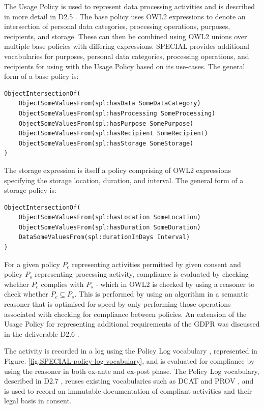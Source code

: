 The Usage Policy \cite{bonatti_special_2018-2} is used to represent data processing activities and is described in more detail in D2.5 \cite{bonatti_d2.5_2018}. The base policy uses OWL2 expressions to denote an intersection of personal data categories, processing operations, purposes, recipients, and storage. These can then be combined using OWL2 unions over multiple base policies with differing expressions. SPECIAL provides additional vocabularies for purposes, personal data categories, processing operations, and recipients for using with the Usage Policy based on its use-cases. The general form of a base policy is:
\begin{lstlisting}
ObjectIntersectionOf(
    ObjectSomeValuesFrom(spl:hasData SomeDataCategory)
    ObjectSomeValuesFrom(spl:hasProcessing SomeProcessing)
    ObjectSomeValuesFrom(spl:hasPurpose SomePurpose)
    ObjectSomeValuesFrom(spl:hasRecipient SomeRecipient)
    ObjectSomeValuesFrom(spl:hasStorage SomeStorage)
)
\end{lstlisting}
The storage expression is itself a policy comprising of OWL2 expressions specifying the storage location, duration, and interval. The general form of a storage policy is:
\begin{lstlisting}
ObjectIntersectionOf(
    ObjectSomeValuesFrom(spl:hasLocation SomeLocation)
    ObjectSomeValuesFrom(spl:hasDuration SomeDuration)
    DataSomeValuesFrom(spl:durationInDays Interval)
)
\end{lstlisting}

For a given policy $P_c$ representing activities permitted by given consent and policy $P_s$ representing processing activity, compliance is evaluated by checking whether $P_c$ complies with $P_s$ - which in OWL2 is checked by using a reasoner to check whether $P_c \subseteq P_s$. This is performed by using an algorithm \cite{bonatti_fast_2018,bonatti_richer_2019} in a semantic reasoner that is optimised for speed by only performing those operations associated with checking for compliance between policies.
An extension of the Usage Policy for representing additional requirements of the GDPR was discussed in the deliverable D2.6 \cite{bonatti_d2.6_2018}.

The activity is recorded in a log using the Policy Log vocabulary \cite{bonatti_special_2018-1}, represented in Figure. \ref{fig:SPECIAL-policy-log-vocabulary}, and is evaluated for compliance by using the reasoner in both ex-ante and ex-post phase. The Policy Log vocabulary, described in D2.7 \cite{kirrane_d2.7_2018}, reuses existing vocabularies such as DCAT and PROV \cite{lebo_prov-o:_2013}, and is used to record an immutable documentation of compliant activities and their legal basis in consent.

